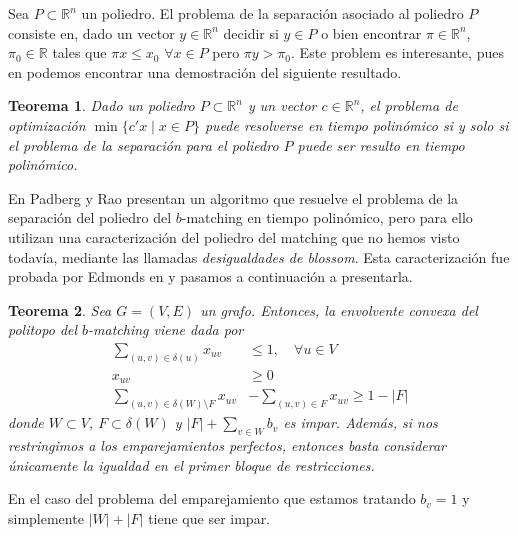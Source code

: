 \documentclass[twoside,a4paper,openright,12pt,tikz]{book}
\newtheorem{thm}{Teorema}[section]
\newcommand{\R}{\mathbb{R}}
\begin{document}
Sea $P\subset \R^n$ un poliedro. El problema de la separación asociado al poliedro $P$ consiste en, dado un vector $y\in \R^n$ decidir si $y\in P$ o bien encontrar $\pi \in \R^n$, $\pi_0\in\R$ tales que $\pi x \leq x_0$ $\forall x \in P$ pero $\pi y > \pi_0$. Este problem es interesante, pues en \cite{sepa} podemos encontrar una demostración del siguiente resultado.
\begin{thm}
Dado un poliedro $P\subset \R^n$ y un vector $c\in \R^n$, el problema de optimización $\min\{c'x \mid x \in P\}$ puede resolverse en tiempo polinómico si y solo si el problema de la separación para el poliedro $P$ puede ser resulto en tiempo polinómico.
\end{thm}
En \cite{rao} Padberg y Rao presentan un algoritmo que resuelve el problema de la separación del poliedro del $b$-matching en tiempo polinómico, pero para ello utilizan una caracterización del poliedro del matching que no hemos visto todavía, mediante las llamadas \textit{desigualdades de blossom}. Esta caracterización fue probada por Edmonds en \cite{edmond} y pasamos a continuación a presentarla.


\begin{thm}
Sea $G=(V,E)$ un grafo. Entonces, la envolvente convexa del politopo del $b$-matching viene dada por
\begin{align*}
\sum_{(u,v)\in\delta(u)} x_{uv} &\leq 1, \quad \forall u\in V\\
x_{uv} &\geq 0\\
\sum_{(u,v)\in \delta(W)\setminus F}x_{uv}& - \sum_{(u,v)\in F}x_{uv} \geq 1 - |F|
\end{align*}
donde $W\subset V$, $F \subset \delta(W)$ y $|F| + \sum_{v \in W} b_v$ es impar. Además, si nos restringimos a los emparejamientos perfectos, entonces basta considerar únicamente la igualdad en el primer bloque de restricciones.
\end{thm}
En el caso del problema del emparejamiento que estamos tratando $b_v = 1$ y simplemente $|W|+|F|$ tiene que ser impar. 
\end{document}
